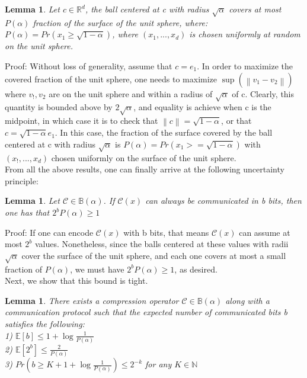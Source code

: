 \documentclass{article}
\newtheorem{lemma}[theorem]{Lemma}
\newcommand{\norm}[1]{\left\| #1 \right\|}
\newcommand{\Exp}[1]{{\mathbb E}\left[#1\right]}
\newcommand{\R}{\mathbb{R}^d}
\newcommand{\N}{\mathbb{N}}
\newcommand{\B}{\mathbb{B}}
\begin{document}
\begin{lemma}
Let $c \in \R$, the ball centered at c with radius $\sqrt{\alpha}$ covers at most $P(\alpha)$ fraction of the surface of the unit sphere, where:\\ $P(\alpha) = Pr(x_1 \ge \sqrt{1-\alpha})$, where $(x_1, ..., x_d)$ is chosen uniformly at random on the unit sphere.
\end{lemma}
Proof: Without loss of generality, assume that $c = e_1$. In order to maximize the covered fraction of the unit sphere, one needs to maximize $\sup(\norm{v_1-v_2})$ where $v_!,v_2$ are on the unit sphere and within a radius of $\sqrt{\alpha}$ of c. Clearly, this quantity is bounded above by $2\sqrt{\alpha}$, and equality is achieve when c is the midpoint, in which case it is to check that 
$\norm{c}=\sqrt{1-\alpha}$, or that $c = \sqrt{1-\alpha}e_1$. In this case, the fraction of the surface covered by the ball centered at c with radius $\sqrt{\alpha}$ is $P(\alpha) = Pr(x_1 >= \sqrt{1-\alpha})$ with $(x_!,..., x_d)$ chosen uniformly on the surface of the unit sphere. \\

From all the above results, one can finally arrive at the following uncertainty principle: 

\begin{lemma}
Let $\mathcal C \in \B(\alpha)$. If $\mathcal C(x)$ can always be communicated in b bits, then one has that $2^bP(\alpha) \ge 1$
\end{lemma}
Proof: If one can encode $\mathcal C(x)$ with b bits, that means $\mathcal C(x)$ can assume at most $2^b$ values. Nonetheless, since the balls centered at these values with radii $\sqrt{\alpha}$ cover the surface of the unit sphere, and each one covers at most a small fraction of $P(\alpha)$, we must have $2^bP(\alpha) \ge 1$, as desired. \\

Next, we show that this bound is tight.

\begin{lemma}
There exists a compression operator $\mathcal C \in \B(\alpha)$ along with a communication protocol such that the expected number of communicated bits b satisfies the following: \\
1) $\Exp{b} \le 1+\log{\frac{1}{P(\alpha)}}$\\
2) $\Exp{2^b} \le \frac{2}{P(\alpha)}$ \\
3) $Pr(b \ge K + 1 + \log{\frac{1}{P(\alpha)}}) \le 2^{-k}$ for any $K \in \N$
\end{lemma}
\end{document}
